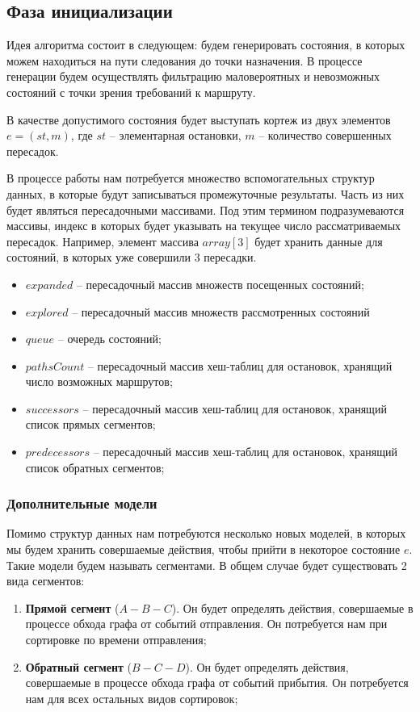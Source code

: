 \subsection{Фаза инициализации}
Идея алгоритма состоит в следующем: будем генерировать состояния, в которых можем находиться на пути следования до точки назначения. В процессе генерации будем осуществлять фильтрацию маловероятных и невозможных состояний с точки зрения требований к маршруту.

В качестве допустимого состояния будет выступать кортеж из двух элементов $e=(st, m)$, где $st$ -- элементарная остановки, $m$ -- количество совершенных пересадок. 

В процессе работы нам потребуется множество вспомогательных структур данных, в которые будут записываться промежуточные результаты. Часть из них будет являться пересадочными массивами. Под этим термином подразумеваются массивы, индекс в которых будет указывать на текущее число рассматриваемых пересадок. Например, элемент массива $array[3]$ будет хранить данные для состояний, в которых уже совершили 3 пересадки.

\begin{itemize}
	\item $expanded$ -- пересадочный массив множеств посещенных состояний;
	\item $explored$ -- пересадочный массив множеств рассмотренных состояний
	\item $queue$ -- очередь состояний;
	\item $pathsCount$ -- пересадочный массив хеш-таблиц для остановок, хранящий число возможных маршрутов;
	\item $successors$ -- пересадочный массив хеш-таблиц для остановок, хранящий список прямых сегментов;
	\item $predecessors$ -- пересадочный массив хеш-таблиц для остановок, хранящий список обратных сегментов;
\end{itemize}

\subsubsection{Дополнительные модели}
Помимо структур данных нам потребуются несколько новых моделей, в которых мы будем хранить совершаемые действия, чтобы прийти в некоторое состояние $e$. Такие модели будем называть сегментами. В общем случае будет существовать 2 вида сегментов:
\begin{enumerate}
	\item \textbf{Прямой сегмент} ($A-B-C$). Он будет определять действия, совершаемые в процессе обхода графа от событий отправления. Он потребуется нам при сортировке по времени отправления;
	\item \textbf{Обратный сегмент} ($B-C-D$). Он будет определять действия, совершаемые в процессе обхода графа от событий прибытия. Он потребуется нам для всех остальных видов сортировок;
\end{enumerate}

